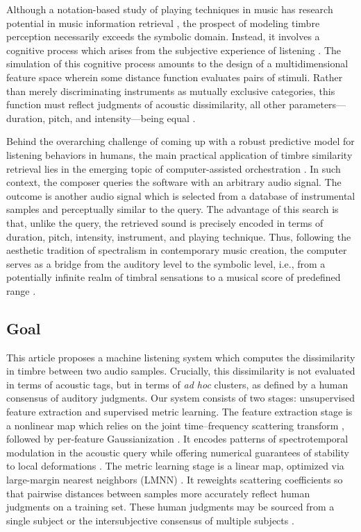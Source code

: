 \documentclass{bmcart}
\makeatletter
\newcommand*{\ie}{i.e.,\@\xspace}
\makeatother
\begin{document}
Although a notation-based study of playing techniques in music has research potential in music information retrieval \cite{calvo2020acm}, the prospect of modeling timbre perception necessarily exceeds the symbolic domain.
Instead, it involves a cognitive process which arises from the subjective experience of listening \cite{erickson1975book}.
The simulation of this cognitive process amounts to the design of a multidimensional feature space wherein some distance function evaluates pairs of stimuli.
Rather than merely discriminating instruments as mutually exclusive categories, this function must reflect judgments of acoustic dissimilarity, all other parameters---duration, pitch, and intensity---being equal \cite{thoret2018jasa}.

Behind the overarching challenge of coming up with a robust predictive model for listening behaviors in humans, the main practical application of timbre similarity retrieval lies in the emerging topic of computer-assisted orchestration \cite{maresz2013cmr}.
In such context, the composer queries the software with an arbitrary audio signal.
The outcome is another audio signal which is selected from a database of instrumental samples and perceptually similar to the query.
The advantage of this search is that, unlike the query, the retrieved sound is precisely encoded in terms of duration, pitch, intensity, instrument, and playing technique.
Thus, following the aesthetic tradition of spectralism in contemporary music creation, the computer serves as a bridge from the auditory level to the symbolic level, \ie{} from a potentially infinite realm of timbral sensations to a musical score of predefined range \cite{caetano2019swarm}.

\subsection*{Goal}
This article proposes a machine listening system which computes the dissimilarity in timbre between two audio samples.
Crucially, this dissimilarity is not evaluated in terms of acoustic tags, but in terms of \emph{ad hoc} clusters, as defined by a human consensus of auditory judgments.
Our system consists of two stages: unsupervised feature extraction and supervised metric learning.
The feature extraction stage is a nonlinear map which relies on the joint time--frequency scattering transform \cite{anden2015mlsp,anden2019tsp}, followed by per-feature Gaussianization \cite{lostanlen2018jasmp}.
It encodes patterns of spectrotemporal modulation in the acoustic query while offering numerical guarantees of stability to local deformations \cite{anden2012scattering}.
The metric learning stage is a linear map, optimized via large-margin nearest neighbors (LMNN) \cite{weinberger2009distance}.
It reweights scattering coefficients so that pairwise distances between samples more accurately reflect human judgments on a training set.
These human judgments may be sourced from a single subject or the intersubjective consensus of multiple subjects \cite{mcadams1995psychres}.
\end{document}
